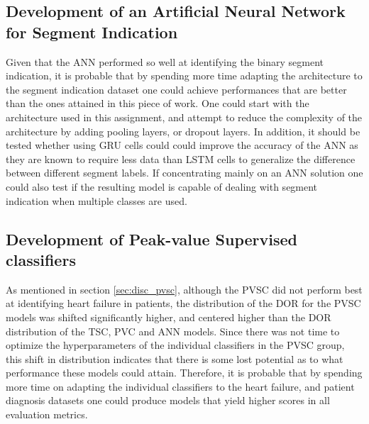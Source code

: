 \subsection*{Development of an Artificial Neural Network for Segment Indication}

Given that the ANN performed so well at identifying the binary segment indication, it is probable that by spending more time adapting the architecture to the segment indication dataset one could achieve performances that are better than the ones attained in this piece of work. One could start with the architecture used in this assignment, and attempt to reduce the complexity of the architecture by adding pooling layers, or dropout layers. In addition, it should be tested whether using GRU cells could could improve the accuracy of the ANN as they are known to require less data than LSTM cells to generalize the difference between different segment labels. If concentrating mainly on an ANN solution one could also test if the resulting model is capable of dealing with segment indication when multiple classes are used. 

\subsection*{Development of Peak-value Supervised classifiers}

As mentioned in section \ref{sec:disc_pvsc}, although the PVSC did not perform best at identifying heart failure in patients, the distribution of the DOR for the PVSC models was shifted significantly higher, and centered higher than the DOR distribution of the TSC, PVC and ANN models. Since there was not time to optimize the hyperparameters of the individual classifiers in the PVSC group, this shift in distribution indicates that there is some lost potential as to what performance these models could attain. Therefore, it is probable that by spending more time on adapting the individual classifiers to the heart failure, and patient diagnosis datasets one could produce models that yield higher scores in all evaluation metrics.
